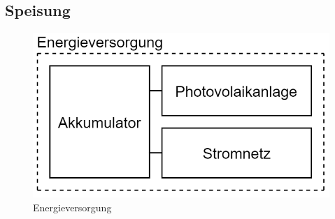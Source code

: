 \newpage
\subsection{Speisung}
\begin{figure}[h]
\centering
\includegraphics[scale=0.6]{graphics/Energieversorgung.PNG}
\caption{Energieversorgung}
\end{figure}
